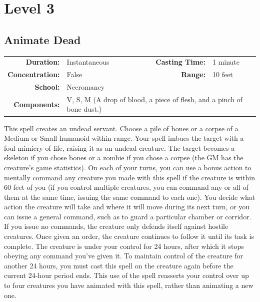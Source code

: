 \documentclass[12pt,showtrims]{memoir}
\begin{document}
\newpage
\chapter*{Level 3} 
\section*{Animate Dead}

{
\small\centering\vspace{-6pt}
\begin{tabular}{rlrl}
\toprule

\textbf{Duration:} & Instantaneous &
\textbf{Casting Time:} & 1 minute \\
\textbf{Concentration:} & False &
\textbf{Range:} & 10 feet \\
\textbf{School:} & Necromancy \\
\textbf{Components:} & \multicolumn{3}{p{0.7\textwidth}}{V, S, M (A drop of blood, a piece of flesh, and a pinch of bone dust.)}\\

\bottomrule
\end{tabular}
}

\vspace{1\baselineskip}\noindent This spell creates an undead servant. Choose a pile of bones or a corpse of a Medium or Small humanoid within range. Your spell imbues the target with a foul mimicry of life, raising it as an undead creature. The target becomes a skeleton if you chose bones or a zombie if you chose a corpse (the GM has the creature's game statistics). On each of your turns, you can use a bonus action to mentally command any creature you made with this spell if the creature is within 60 feet of you (if you control multiple creatures, you can command any or all of them at the same time, issuing the same command to each one). You decide what action the creature will take and where it will move during its next turn, or you can issue a general command, such as to guard a particular chamber or corridor. If you issue no commands, the creature only defends itself against hostile creatures. Once given an order, the creature continues to follow it until its task is complete. The creature is under your control for 24 hours, after which it stops obeying any command you've given it. To maintain control of the creature for another 24 hours, you must cast this spell on the creature again before the current 24-hour period ends. This use of the spell reasserts your control over up to four creatures you have animated with this spell, rather than animating a new one.
\end{document}

